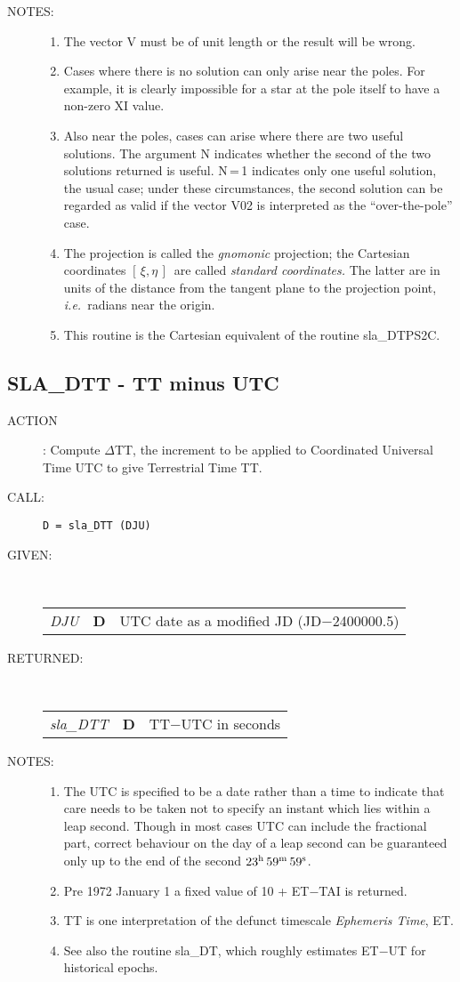 \documentclass[11pt,twoside]{article}
\newcommand{\xlabel}[1]{}
\newcommand{\xieta}     {$[\,\xi,\eta\,]$}
\newcommand{\routine}[3]
{\hbadness=10000
  \vbox
  {
    \rule{\textwidth}{0.3mm}\\
    {\Large {\bf #1} \hfill #2 \hfill {\bf #1}}\\
    \setlength{\oldspacing}{\topsep}
    \setlength{\topsep}{0.3ex}
    \begin{description}
      #3
    \end{description}
    \setlength{\topsep}{\oldspacing}
  }
}
\renewcommand{\routine}[3]
   {
      \subsection{#1\xlabel{#1} - #2\label{#1}}
       \begin{description}
         #3
       \end{description}
   }
\newcommand{\action}[1]
{\item[ACTION]: #1}
\newcommand{\action}[1]
   {\item[ACTION:] #1}
\newcommand{\call}[1]
{\item[CALL]: \hspace{0.4em}{\tt #1}}
\newlength{\oldspacing}
\renewcommand{\call}[1]
   {
    \item[CALL:] {\tt #1}
   }
\newcommand{\args}[2]
{
  \goodbreak
  \setlength{\oldspacing}{\topsep}
  \setlength{\topsep}{0.3ex}
  \begin{description}
  \item[#1]:\\[1.5ex]
    \begin{tabular}{p{7em}p{6em}p{22em}}
      #2
    \end{tabular}
  \end{description}
  \setlength{\topsep}{\oldspacing}
}
\renewcommand{\args}[2]
   {
     \begin{description}
        \item[#1:]\\
        \begin{tabular}{p{7em}p{6em}l}
           #2
        \end{tabular}
     \end{description}
   }
\newcommand{\spec}[3]
{
  {\em {#1}} & {\bf \mbox{#2}} & {#3}
}
\newcommand{\notes}[1]
{
  \goodbreak
  \setlength{\oldspacing}{\topsep}
  \setlength{\topsep}{0.3ex}
  \begin{description}
    \item[NOTES]:
        #1
  \end{description}
  \setlength{\topsep}{\oldspacing}
}
\renewcommand{\notes}[1]
   {
      \begin{description}
         \item[NOTES:]
            #1
      \end{description}
   }
\begin{document}
\notes
{
 \begin{enumerate}
  \item The vector V must be of unit length or the result will be wrong.
  \item Cases where there is no solution can only arise near the poles.
        For example, it is clearly impossible for a star at the pole
        itself to have a non-zero XI value.
  \item Also near the poles, cases can arise where there are two useful
        solutions.  The argument N indicates whether the second of the
        two solutions returned is useful.
        N\,=\,1
        indicates only one useful solution, the usual case;  under these
        circumstances, the second solution can be regarded as valid if
        the vector V02 is interpreted as the ``over-the-pole'' case.
  \item The projection is called the {\it gnomonic}\/ projection;  the
        Cartesian coordinates \xieta\ are called 
        {\it standard coordinates.}\/  The latter
        are in units of the distance from the tangent plane to the projection
        point, {\it i.e.}\ radians near the origin.
  \item This routine is the Cartesian equivalent of the routine sla\_DTPS2C.
 \end{enumerate}
}
\routine{SLA\_DTT}{TT minus UTC}
{
 \action{Compute $\Delta$TT, the increment to be applied to
         Coordinated Universal Time UTC to give
         Terrestrial Time TT.}
 \call{D~=~sla\_DTT (DJU)}
}
\args{GIVEN}
{
 \spec{DJU}{D}{UTC date as a modified JD (JD$-$2400000.5)}
}
\args{RETURNED}
{
 \spec{sla\_DTT}{D}{TT$-$UTC in seconds}
}
\notes
{
 \begin{enumerate}
  \item The UTC is specified to be a date rather than a time to indicate
        that care needs to be taken not to specify an instant which lies
        within a leap second.  Though in most cases UTC can include the
        fractional part, correct behaviour on the day of a leap second
        can be guaranteed only up to the end of the second
        $23^{\rm h}\,59^{\rm m}\,59^{\rm s}$.
  \item Pre 1972 January 1 a fixed value of 10 + ET$-$TAI is returned.
  \item TT is one interpretation of the defunct timescale
        {\it Ephemeris Time}, ET.
  \item See also the routine sla\_DT, which roughly estimates ET$-$UT for
        historical epochs.
 \end{enumerate}
}
\end{document}

